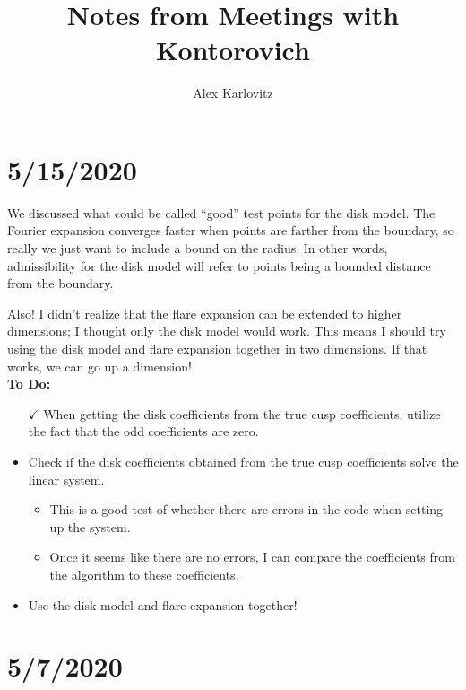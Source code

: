 \documentclass[]{article}
\title{Notes from Meetings with Kontorovich}
\author{Alex Karlovitz}
\date{}
\begin{document}
	
	\maketitle

\section*{5/15/2020}

We discussed what could be called ``good'' test points for the disk model.
The Fourier expansion converges faster when points are farther from the boundary, so really we just want to include a bound on the radius.
In other words, admissibility for the disk model will refer to points being a bounded distance from the boundary.

Also!
I didn't realize that the flare expansion can be extended to higher dimensions; I thought only the disk model would work.
This means I should try using the disk model and flare expansion together in two dimensions.
If that works, we can go up a dimension!
\\

\textbf{To Do:}
\begin{itemize}
	\item[$\checkmark$] When getting the disk coefficients from the true cusp coefficients, utilize the fact that the odd coefficients are zero.
	\item Check if the disk coefficients obtained from the true cusp coefficients solve the linear system.
	\begin{itemize}
		\item This is a good test of whether there are errors in the code when setting up the system.
		\item Once it seems like there are no errors, I can compare the coefficients from the algorithm to these coefficients.
	\end{itemize}
	\item Use the disk model and flare expansion together!
\end{itemize}
	
\section*{5/7/2020}
\end{document}

